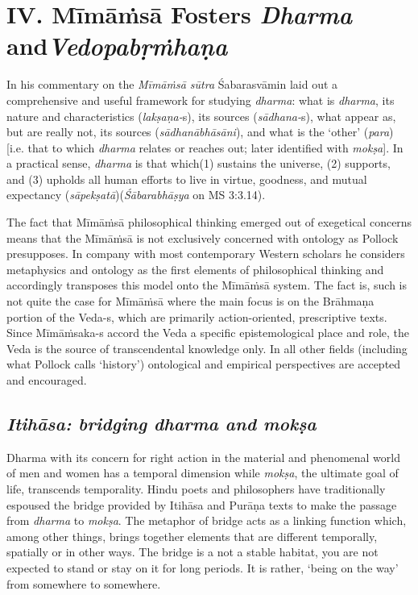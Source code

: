 \section*{IV. Mīmāṁsā Fosters \textit{Dharma} and\hfill \break \textit{Vedopabṛṁhaṇa}}

In his commentary on the \textit{Mīmāṁsā sūtra} Śabarasvāmin laid out a comprehensive and useful framework for studying \textit{dharma}: what is \textit{dharma}, its nature and characteristics (\textit{lakṣaṇa-}s), its sources \hbox{(\textit{sādhana-}s)}, what appear as, but are really not, its sources (\textit{sādhanābhāsāni}), and what is the ‘other’ (\textit{para}) [i.e. that to which \textit{dharma} relates or reaches out; later identified with \textit{mokṣa}]. In a practical sense, \textit{dharma} is that which\break (1) sustains the universe, (2) supports, and (3) upholds all human efforts to live in virtue, goodness, and mutual expectancy (\textit{sāpekṣatā})\break(\textit{Śābarabhāṣya} on MS 3:3.14).

The fact that Mīmāṁsā philosophical thinking emerged out of exegetical concerns means that the Mīmāṁsā is not exclusively concerned with ontology as Pollock presupposes. In company with most contemporary Western scholars he considers metaphysics and ontology as the first elements of philosophical thinking and accordingly transposes this model onto the Mīmāṁsā system. The fact is, such is not quite the case for Mīmāṁsā where the main focus is on the Brāhmaṇa portion of the Veda-s, which are primarily action-oriented, prescriptive texts. Since Mīmāṁsaka-s accord the Veda a specific epistemological place and role, the Veda is the source of transcendental knowledge only. In all other fields (including what Pollock calls ‘history’) ontological and empirical perspectives are accepted and encouraged.

\subsection*{\textit{Itihāsa: bridging dharma and mokṣa}}

Dharma with its concern for right action in the material and phenomenal world of men and women has a temporal dimension while \textit{mokṣa}, the ultimate goal of life, transcends temporality. Hindu poets and philosophers have traditionally espoused the bridge provided by Itihāsa and Purāṇa texts to make the passage from \textit{dharma} to \textit{mokṣa}. The metaphor of bridge acts as a linking function which, among other things, brings together elements that are different temporally, spatially or in other ways. The bridge is a not a stable habitat, you are not expected to stand or stay on it for long periods. It is rather, ‘being on the way’ from somewhere to somewhere.

